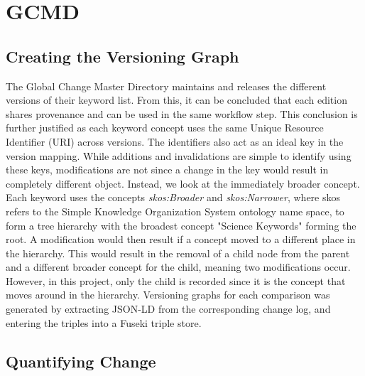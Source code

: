 \section{GCMD}

\subsection{Creating the Versioning Graph}

The Global Change Master Directory maintains and releases the different versions of their keyword list.
From this, it can be concluded that each edition shares provenance and can be used in the same workflow step.
This conclusion is further justified as each keyword concept uses the same Unique Resource Identifier (URI) across versions.
The identifiers also act as an ideal key in the version mapping.
While additions and invalidations are simple to identify using these keys, modifications are not since a change in the key would result in completely different object.
Instead, we look at the immediately broader concept.
Each keyword uses the concepts \textit{skos:Broader} and \textit{skos:Narrower}, where skos refers to the Simple Knowledge Organization System ontology name space, to form a tree hierarchy with the broadest concept "Science Keywords" forming the root.
A modification would then result if a concept moved to a different place in the hierarchy.
This would result in the removal of a child node from the parent and a different broader concept for the child, meaning two modifications occur.
However, in this project, only the child is recorded since it is the concept that moves around in the hierarchy.
Versioning graphs for each comparison was generated by extracting JSON-LD from the corresponding change log, and entering the triples into a Fuseki triple store.

\subsection{Quantifying Change}

